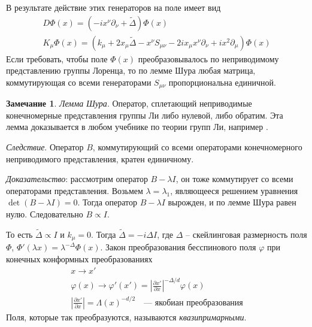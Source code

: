 \documentclass[a4paper,12pt]{article}
\theoremstyle{definition}
\theoremstyle{definition}
\newtheorem{mynote}{Замечание}[section]
\theoremstyle{definition}
\begin{document}
В результате действие этих генераторов на поле имеет вид
\begin{eqnarray}
  \label{eq:181}
  D\Phi(x)=(-ix^{\nu}\partial_{\nu}+\tilde \Delta)\Phi(x)\\
  K_{\mu}\Phi(x)=(k_{\mu}+2x_{\mu}\tilde\Delta -x^{\nu}S_{\mu\nu}-2ix_{\mu}x^{\nu}\partial_{\nu}+ix^{2} \partial_{\mu})\Phi(x)
\end{eqnarray}
Если требовать, чтобы поле $\Phi(x)$ преобразовывалось по неприводимому представлению группы
Лоренца, то по лемме Шура любая матрица, коммутирующая со всеми генераторами $S_{\mu\nu}$
пропорциональна единичной.   
\begin{mynote}
  
  {\it Лемма Шура}. Оператор, сплетающий неприводимые конечномерные представления группы Ли либо нулевой, либо обратим. Эта лемма доказывается в любом учебнике по теории групп Ли, например \cite{golod2001}. 

  {\it Следствие}. Оператор $B$, коммутирующий со всеми операторами конечномерного неприводимого представления, кратен единичному.

  {\it Доказательство}: рассмотрим оператор $B-\lambda I$, он тоже коммутирует со всеми операторами представления. Возьмем $\lambda=\lambda_1$, являющееся решением уравнения $\det (B-\lambda I)=0$. Тогда оператор $B-\lambda I$ вырожден, и по лемме Шура равен нулю. Следовательно $B\propto I$.
\end{mynote}

То есть $\tilde \Delta\propto I$ и $k_{\mu}=0$. Тогда $\tilde \Delta =-i \Delta I$, где $\Delta$ --
скейлинговая размерность поля $\Phi$, $\Phi'(\lambda x)=\lambda^{-\Delta}\Phi(x)$. Закон
преобразования бесспинового поля $\varphi$ при конечных конформных преобразованиях 
\begin{eqnarray}
  \label{eq:182}
  x\to x'\\
  \varphi(x)\to \varphi'(x')=\left|\frac{\partial x'}{\partial x}\right|^{-\Delta/d}\varphi(x)\\
  \left|\frac{\partial x'}{\partial x}\right|=\Lambda(x)^{-d/2}    \quad\mbox{--- якобиан преобразования}
\end{eqnarray}
Поля, которые так преобразуются, называются {\it квазипримарными}.
\end{document}
